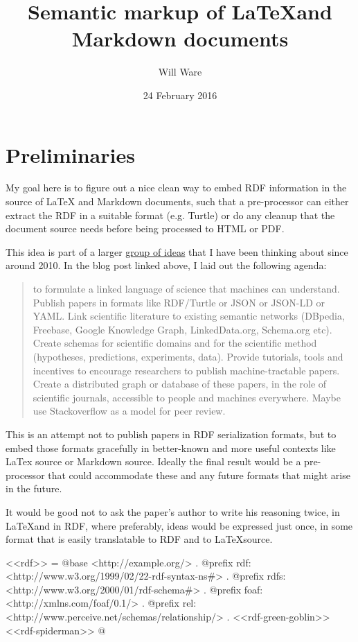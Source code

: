 \documentclass{article}
\title{Semantic markup of \LaTeX and Markdown documents}
\author{Will Ware}
\date{24 February 2016}
\begin{document}
\maketitle
\section {Preliminaries}
My goal here is to figure out a nice clean way to embed RDF information in the source
of LaTeX and Markdown documents, such that a pre-processor can either extract the RDF
in a suitable format (e.g. Turtle) or do any cleanup that the document source needs
before being processed to HTML or PDF.

This idea is part of a larger
\href{http://willware.blogspot.com/2013/10/bar-camp-boston-2013-talk-on-automation.html}{group of ideas}
that I have been thinking about since around 2010. In the blog post linked above, I
laid out the following agenda:

\begin{quotation}
to formulate a linked language of science that machines can understand. Publish
papers in formats like RDF/Turtle or JSON or JSON-LD or YAML. Link scientific
literature to existing semantic networks (DBpedia, Freebase, Google Knowledge Graph,
LinkedData.org, Schema.org etc). Create schemas for scientific domains and for the
scientific method (hypotheses, predictions, experiments, data). Provide tutorials,
tools and incentives to encourage researchers to publish machine-tractable papers.
Create a distributed graph or database of these papers, in the role of scientific
journals, accessible to people and machines everywhere. Maybe use Stackoverflow as
a model for peer review.
\end{quotation}

This is an attempt not to publish papers in RDF serialization formats, but to embed
those formats gracefully in better-known and more useful contexts like LaTex source
or Markdown source. Ideally the final result would be a pre-processor that could
accommodate these and any future formats that might arise in the future.

It would be good not to ask the paper's author to write his reasoning twice,
in \LaTeX and in RDF, where preferably, ideas would be expressed just once,
in some format that is easily translatable to RDF and to \LaTeX source.

<<rdf>> =
@base <http://example.org/> .
@prefix rdf: <http://www.w3.org/1999/02/22-rdf-syntax-ns#> .
@prefix rdfs: <http://www.w3.org/2000/01/rdf-schema#> .
@prefix foaf: <http://xmlns.com/foaf/0.1/> .
@prefix rel: <http://www.perceive.net/schemas/relationship/> .
<<rdf-green-goblin>>
<<rdf-spiderman>>
@
\end{document}
